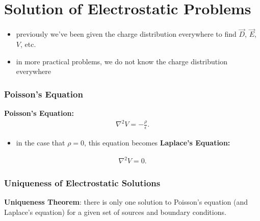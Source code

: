 \documentclass[10pt]{article}
\begin{document}
\part{Solution of Electrostatic Problems}
\begin{itemize}
    \item previously we've been given the charge distribution everywhere to find $\vec{D}$, $\vec{E}$, $V$, etc.
    \item in more practical problems, we do not know the charge distribution everywhere
\end{itemize}

\section{Poisson's Equation}
\begin{theorem}
    \textbf{Poisson's Equation:} 
    \begin{gather*}
        \nabla^2 V = -\frac{\rho}{\epsilon}
    .\end{gather*}
    \begin{itemize}
        \item in the case that $\rho = 0$, this equation becomes \textbf{Laplace's Equation:} 
    \end{itemize}
    \begin{gather*}
        \nabla^2 V = 0
    .\end{gather*}
\end{theorem}

\section{Uniqueness of Electrostatic Solutions}
\begin{theorem}
    \textbf{Uniqueness Theorem}: there is only one solution to Poisson's equation (and Laplace's equation) for a given set of sources and boundary conditions.
\end{theorem}
\end{document}
